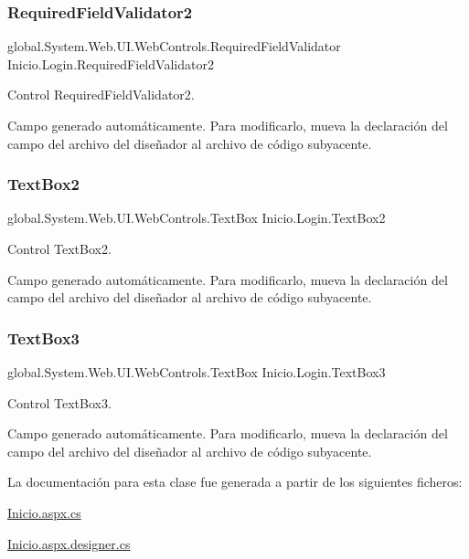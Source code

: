 \subsubsection{\texorpdfstring{RequiredFieldValidator2}{RequiredFieldValidator2}}
{\footnotesize\ttfamily global.\+System.\+Web.\+U\+I.\+Web\+Controls.\+Required\+Field\+Validator Inicio.\+Login.\+Required\+Field\+Validator2\hspace{0.3cm}{\ttfamily [protected]}}



Control Required\+Field\+Validator2. 

Campo generado automáticamente. Para modificarlo, mueva la declaración del campo del archivo del diseñador al archivo de código subyacente. \mbox{\label{classInicio_1_1Login_ac99495a6fbd78cbf118b7c058815e9f2}} 
\subsubsection{\texorpdfstring{TextBox2}{TextBox2}}
{\footnotesize\ttfamily global.\+System.\+Web.\+U\+I.\+Web\+Controls.\+Text\+Box Inicio.\+Login.\+Text\+Box2\hspace{0.3cm}{\ttfamily [protected]}}



Control Text\+Box2. 

Campo generado automáticamente. Para modificarlo, mueva la declaración del campo del archivo del diseñador al archivo de código subyacente. \mbox{\label{classInicio_1_1Login_af3c872110454773d5d53d83c27e6ccb6}} 
\subsubsection{\texorpdfstring{TextBox3}{TextBox3}}
{\footnotesize\ttfamily global.\+System.\+Web.\+U\+I.\+Web\+Controls.\+Text\+Box Inicio.\+Login.\+Text\+Box3\hspace{0.3cm}{\ttfamily [protected]}}



Control Text\+Box3. 

Campo generado automáticamente. Para modificarlo, mueva la declaración del campo del archivo del diseñador al archivo de código subyacente. 

La documentación para esta clase fue generada a partir de los siguientes ficheros\+:\begin{DoxyCompactItemize}
\item 
\mbox{\hyperlink{Inicio_8aspx_8cs}{Inicio.\+aspx.\+cs}}\item 
\mbox{\hyperlink{Inicio_8aspx_8designer_8cs}{Inicio.\+aspx.\+designer.\+cs}}\end{DoxyCompactItemize}
